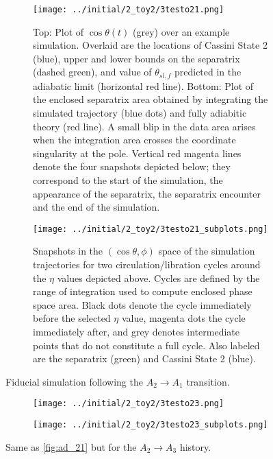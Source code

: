 \documentclass[
        fleqn,
        usenatbib,
    ]{mnras}
\newcommand*{\p}[1]{\left(#1\right)}
\begin{document}
\begin{figure}
    \centering
    \begin{subfigure}{\columnwidth}
        \centering
        \texttt{[image: ../initial/2\_toy2/3testo21.png]}
        \caption{Top: Plot of $\cos \theta(t)$ (grey) over an example
        simulation. Overlaid are the locations of Cassini State 2 (blue), upper
        and lower bounds on the separatrix (dashed green), and value of
        $\theta_{sl,f}$ predicted in the adiabatic limit (horizontal red line).
        Bottom: Plot of the enclosed separatrix area obtained by integrating the
        simulated trajectory (blue dots) and fully adiabitic theory (red line).
        A small blip in the data area arises when the integration area crosses
        the coordinate singularity at the pole. Vertical red magenta lines
        denote the four snapshots depicted below; they correspond to the start
        of the simulation, the appearance of the separatrix, the separatrix
        encounter and the end of the simulation.}
    \end{subfigure}
    \begin{subfigure}{\columnwidth}
        \centering
        \texttt{[image: ../initial/2\_toy2/3testo21\_subplots.png]}
        \caption{Snapshots in the $\p{\cos \theta, \phi}$ space of the
        simulation trajectories for two circulation/libration cycles around the
        $\eta$ values depicted above. Cycles are defined by the range of
        integration used to compute enclosed phase space area. Black dots denote
        the cycle immediately before the selected $\eta$ value, magenta dots the
        cycle immediately after, and grey denotes intermediate points that do
        not constitute a full cycle. Also labeled are the separatrix (green) and
        Cassini State 2 (blue).}
    \end{subfigure}
    \caption{Fiducial simulation following the $A_2 \to A_1$
    transition.}\label{fig:ad_21}
\end{figure}
\begin{figure}
    \centering
    \begin{subfigure}{\columnwidth}
        \centering
        \texttt{[image: ../initial/2\_toy2/3testo23.png]}
    \end{subfigure}
    \begin{subfigure}{\columnwidth}
        \centering
        \texttt{[image: ../initial/2\_toy2/3testo23\_subplots.png]}
    \end{subfigure}
    \caption{Same as \autoref{fig:ad_21} but for the $A_2 \to A_3$ history.
    }\label{fig:ad_23}
\end{figure}
\end{document}
